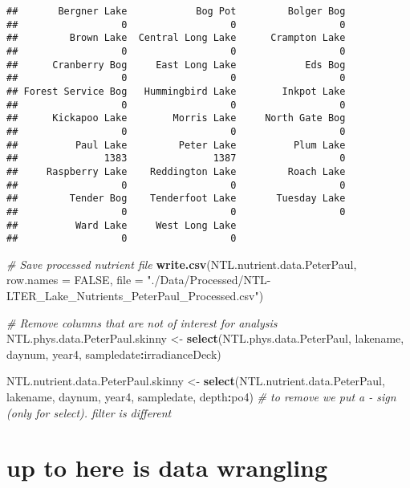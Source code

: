 \documentclass[]{article}
\newenvironment{Shaded}{\begin{snugshade}}{\end{snugshade}}
\newcommand{\KeywordTok}[1]{\textcolor[rgb]{0.13,0.29,0.53}{\textbf{#1}}}
\newcommand{\DataTypeTok}[1]{\textcolor[rgb]{0.13,0.29,0.53}{#1}}
\newcommand{\StringTok}[1]{\textcolor[rgb]{0.31,0.60,0.02}{#1}}
\newcommand{\CommentTok}[1]{\textcolor[rgb]{0.56,0.35,0.01}{\textit{#1}}}
\newcommand{\OtherTok}[1]{\textcolor[rgb]{0.56,0.35,0.01}{#1}}
\newcommand{\OperatorTok}[1]{\textcolor[rgb]{0.81,0.36,0.00}{\textbf{#1}}}
\newcommand{\NormalTok}[1]{#1}
\begin{document}
\begin{verbatim}
##       Bergner Lake            Bog Pot         Bolger Bog 
##                  0                  0                  0 
##         Brown Lake  Central Long Lake      Crampton Lake 
##                  0                  0                  0 
##      Cranberry Bog     East Long Lake            Eds Bog 
##                  0                  0                  0 
## Forest Service Bog   Hummingbird Lake        Inkpot Lake 
##                  0                  0                  0 
##      Kickapoo Lake        Morris Lake     North Gate Bog 
##                  0                  0                  0 
##          Paul Lake         Peter Lake          Plum Lake 
##               1383               1387                  0 
##     Raspberry Lake    Reddington Lake         Roach Lake 
##                  0                  0                  0 
##         Tender Bog    Tenderfoot Lake       Tuesday Lake 
##                  0                  0                  0 
##          Ward Lake     West Long Lake 
##                  0                  0
\end{verbatim}

\begin{Shaded}
\begin{Highlighting}[]
\CommentTok{# Save processed nutrient file}
\KeywordTok{write.csv}\NormalTok{(NTL.nutrient.data.PeterPaul, }\DataTypeTok{row.names =} \OtherTok{FALSE}\NormalTok{, }\DataTypeTok{file =} \StringTok{"./Data/Processed/NTL-LTER_Lake_Nutrients_PeterPaul_Processed.csv"}\NormalTok{)}

\CommentTok{# Remove columns that are not of interest for analysis}
\NormalTok{NTL.phys.data.PeterPaul.skinny <-}\StringTok{ }\KeywordTok{select}\NormalTok{(NTL.phys.data.PeterPaul, }
\NormalTok{                                         lakename, daynum, year4, sampledate}\OperatorTok{:}\NormalTok{irradianceDeck)}
  
\NormalTok{NTL.nutrient.data.PeterPaul.skinny <-}\StringTok{ }\KeywordTok{select}\NormalTok{(NTL.nutrient.data.PeterPaul, }
\NormalTok{                                             lakename, daynum, year4, sampledate, depth}\OperatorTok{:}\NormalTok{po4)   }\CommentTok{# to remove we put a - sign (only for select). filter is different}
\end{Highlighting}
\end{Shaded}

\section{up to here is data
wrangling}\label{up-to-here-is-data-wrangling}
\end{document}
